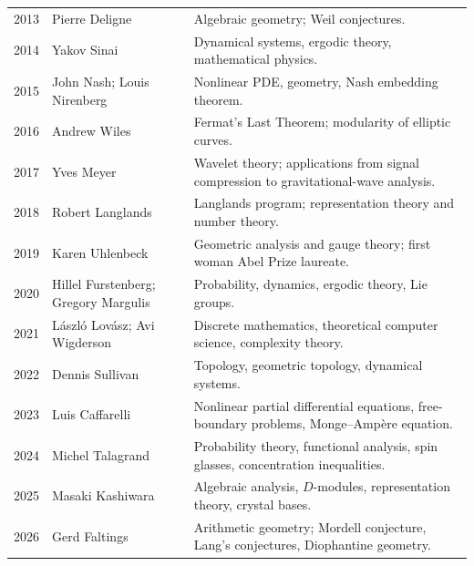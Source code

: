 {\begin{longtable}{@{}L{0.08\textwidth}L{0.32\textwidth}L{0.52\textwidth}@{}}
        2013 & Pierre Deligne
        & Algebraic geometry; Weil conjectures. \\

        2014 & Yakov Sinai
        & Dynamical systems, ergodic theory, mathematical physics. \\

        2015 & John Nash; Louis Nirenberg
        & Nonlinear PDE, geometry, Nash embedding theorem. \\

        2016 & Andrew Wiles
        & Fermat's Last Theorem; modularity of elliptic curves. \\

        2017 & Yves Meyer
        & Wavelet theory; applications from signal compression to gravitational-wave analysis. \\

        2018 & Robert Langlands
        & Langlands program; representation theory and number theory. \\

        2019 & Karen Uhlenbeck
        & Geometric analysis and gauge theory; first woman Abel Prize laureate. \\

        2020 & Hillel Furstenberg; Gregory Margulis
        & Probability, dynamics, ergodic theory, Lie groups. \\

        2021 & László Lovász; Avi Wigderson
        & Discrete mathematics, theoretical computer science, complexity theory. \\

        2022 & Dennis Sullivan
        & Topology, geometric topology, dynamical systems. \\

        2023 & Luis Caffarelli
        & Nonlinear partial differential equations, free-boundary problems, Monge--Ampère equation. \\

        2024 & Michel Talagrand
        & Probability theory, functional analysis, spin glasses, concentration inequalities. \\

        2025 & Masaki Kashiwara
        & Algebraic analysis, $D$-modules, representation theory, crystal bases. \\

        2026 & Gerd Faltings
        & Arithmetic geometry; Mordell conjecture, Lang's conjectures, Diophantine geometry. \\
    \end{longtable}
    }

